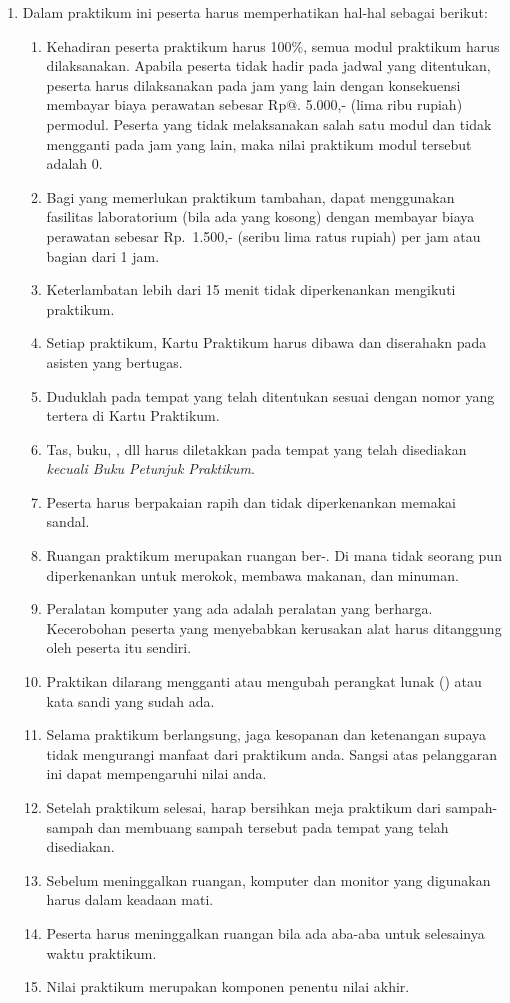 \documentclass[../main.tex]{subfiles}
\begin{document}
\begin{enumerate}
\item Dalam praktikum ini peserta harus memperhatikan hal-hal sebagai berikut:
  \begin{enumerate}
  \item Kehadiran peserta praktikum harus 100\%, semua modul praktikum harus dilaksanakan. Apabila peserta tidak hadir pada jadwal yang ditentukan, peserta harus dilaksanakan pada jam yang lain dengan konsekuensi membayar biaya perawatan sebesar Rp@. 5.000,- (lima ribu rupiah) permodul. Peserta yang tidak melaksanakan salah satu modul dan tidak mengganti pada jam yang lain, maka nilai praktikum modul tersebut adalah 0.
  \item Bagi yang memerlukan praktikum tambahan, dapat menggunakan fasilitas laboratorium (bila ada yang kosong) dengan membayar biaya perawatan sebesar Rp.\ 1.500,- (seribu lima ratus rupiah) per jam atau bagian dari 1 jam.
  \item Keterlambatan lebih dari 15 menit tidak diperkenankan mengikuti praktikum.
  \item Setiap praktikum, Kartu Praktikum harus dibawa dan diserahakn pada asisten yang bertugas.
  \item Duduklah pada tempat yang telah ditentukan sesuai dengan nomor yang tertera di Kartu Praktikum.
  \item Tas, buku, , dll harus diletakkan pada tempat yang telah disediakan \emph{kecuali Buku Petunjuk Praktikum}.
  \item Peserta harus berpakaian rapih dan tidak diperkenankan memakai sandal.
  \item Ruangan praktikum merupakan ruangan ber-. Di mana tidak seorang pun diperkenankan untuk merokok, membawa makanan, dan minuman.
  \item Peralatan komputer yang ada adalah peralatan yang berharga. Kecerobohan peserta yang menyebabkan kerusakan alat harus ditanggung oleh peserta itu sendiri.
  \item Praktikan dilarang mengganti atau mengubah perangkat lunak () atau kata sandi yang sudah ada.
  \item Selama praktikum berlangsung, jaga kesopanan dan ketenangan supaya tidak mengurangi manfaat dari praktikum anda. Sangsi atas pelanggaran ini dapat mempengaruhi nilai anda.
  \item Setelah praktikum selesai, harap bersihkan meja praktikum dari sampah-sampah dan membuang sampah tersebut pada tempat yang telah disediakan.
  \item Sebelum meninggalkan ruangan, komputer dan monitor yang digunakan harus dalam keadaan mati.
  \item Peserta harus meninggalkan ruangan bila ada aba-aba untuk selesainya waktu praktikum.
  \item Nilai praktikum merupakan komponen penentu nilai akhir.
  \end{enumerate}
\end{enumerate}
\end{document}
